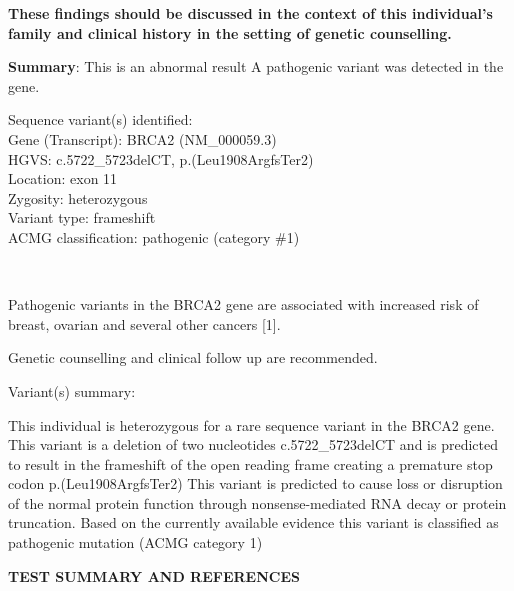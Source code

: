 \documentclass[10pt]{article}
\begin{document}
\vspace{-1em}
\hfill \parbox{19cm}{
{\bf These findings should be discussed in the context of this individual's family and clinical history in the setting of genetic counselling.}

\vspace{1em}
{\bf Summary}: This is an abnormal result A pathogenic variant was detected in the
gene.

\vspace{1em}
Sequence variant(s) identified:\\
Gene (Transcript): BRCA2 (NM\_000059.3) \\
\vspace{1em}
HGVS: c.5722\_5723delCT, p.(Leu1908ArgfsTer2) \\
Location: exon 11 \\
Zygosity: heterozygous \\
Variant type: frameshift \\
ACMG classification: pathogenic (category \#1)
}


\\

\vspace{-1em}
\hfill \parbox{19cm}{
Pathogenic variants in the BRCA2 gene are associated with increased risk of breast, ovarian and several other cancers [1].

\vspace{1em}
Genetic counselling and clinical follow up are recommended.

\vspace{1em}
Variant(s) summary:

\vspace{1em}
This individual is heterozygous for a rare sequence variant in the BRCA2 gene. This variant is a deletion of two nucleotides c.5722\_5723delCT and is predicted to result in the frameshift of the open reading frame creating a premature stop codon p.(Leu1908ArgfsTer2) This variant is predicted to cause loss or disruption of the normal protein function through nonsense-mediated RNA decay or protein truncation. Based on the currently available evidence this variant is classified as pathogenic mutation (ACMG category 1)
}

{\bf TEST SUMMARY AND REFERENCES}
\end{document}
